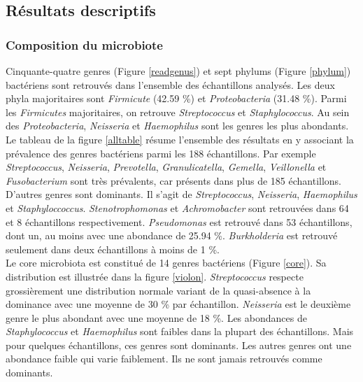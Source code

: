 \documentclass[12pt,a4paper]{article}
\begin{document}
\subsection{Résultats descriptifs}
\subsubsection{Composition du microbiote}
Cinquante-quatre genres (Figure \ref{readgenus}) et sept phylums (Figure \ref{phylum}) bactériens sont retrouvés dans l'ensemble des échantillons analysés.
Les deux phyla majoritaires sont \textit{Firmicute} (42.59 \%) et \textit{Proteobacteria} (31.48 \%). Parmi les \textit{Firmicutes} majoritaires, on retrouve \textit{Streptococcus} et \textit{Staphylococcus}. Au sein des \textit{Proteobacteria}, \textit{Neisseria} et \textit{Haemophilus} sont les genres les plus abondants.
Le tableau de la figure \ref{alltable} résume l'ensemble des résultats en y associant la prévalence des genres bactériens parmi les 188 échantillons.
Par exemple \textit{Streptococcus}, \textit{Neisseria}, \textit{Prevotella}, \textit{Granulicatella}, \textit{Gemella}, \textit{Veillonella} et \textit{Fusobacterium} sont très prévalents, car présents dans plus de 185 échantillons.
D’autres genres sont dominants. Il s’agit de \textit{Streptococcus}, \textit{Neisseria}, \textit{Haemophilus} et \textit{Staphyloccoccus}. \textit{Stenotrophomonas} et \textit{Achromobacter} sont retrouvées dans 64 et 8 échantillons respectivement. \textit{Pseudomonas} est retrouvé dans 53 échantillons, dont un, au moins avec une abondance de 25.94 \%. \textit{Burkholderia} est retrouvé seulement dans deux échantillons à moins de 1 \%.\\
Le core microbiota est constitué de 14 genres bactériens (Figure \ref{core}). Sa distribution est illustrée dans la figure \ref{violon}.
\textit{Streptococcus} respecte grossièrement une distribution normale variant de la quasi-absence à la dominance avec une moyenne de 30 \% par échantillon. \textit{Neisseria} est le deuxième genre le plus abondant avec une moyenne de 18 \%.
Les abondances de \textit{Staphylococcus} et \textit{Haemophilus} sont faibles dans la plupart des échantillons. Mais pour quelques échantillons, ces genres sont dominants. Les autres genres ont une abondance faible qui varie faiblement. Ils ne sont jamais retrouvés comme dominants.
\end{document}

